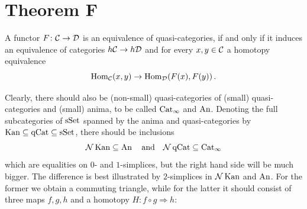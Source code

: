         \section{Theorem F}
        A functor $F \colon \mathcal{C} \to \mathcal{D}$ is an equivalence of quasi-categories, if and only if it induces an equivalence of categories $h\mathcal{C} \to h\mathcal{D}$ and for every $x, y \in \mathcal{C}$ a homotopy equivalence
        \begin{equation*}
            \operatorname{Hom}_{\mathcal{C}}(x, y) \to \operatorname{Hom}_{\mathcal{D}}(F(x), F(y)) \,.
        \end{equation*}

        Clearly, there should also be (non-small) quasi-categories of (small) quasi-categories and (small) anima, to be called $\operatorname{Cat}_{\infty}$ and $\operatorname{An}$. Denoting the full subcategories of $\operatorname{sSet}$ spanned by the anima and quasi-categories by $\operatorname{Kan} \subseteq \operatorname{qCat} \subseteq \operatorname{sSet}$, there should be inclusions
        \begin{equation*}
            \mathcal{N} \operatorname{Kan} \subseteq \operatorname{An} \quad \text{and} \quad \mathcal{N} \operatorname{qCat} \subseteq \operatorname{Cat}_{\infty}
        \end{equation*}
        which are equalities on $0$- and $1$-simplices, but the right hand side will be much bigger. The difference is best illustrated by $2$-simplices in $\mathcal{N} \operatorname{Kan}$ and $\operatorname{An}$. For the former we obtain a commuting triangle, while for the latter it should consist of three maps $f, g, h$ and a homotopy $H \colon f \circ g \Rightarrow h$:
